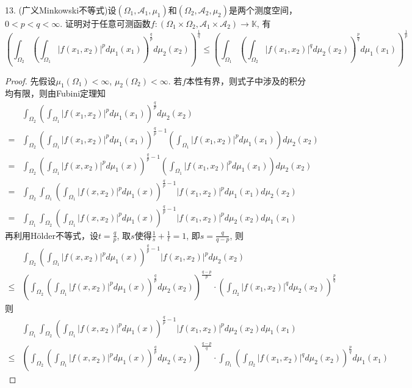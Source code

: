 \documentclass[a4paper,8pt]{ctexart}\textwidth 140mm \textheight 216mm
\newcommand{\A}{{\mathcal A}}
\newcommand{\8}{\infty}
\begin{document}
13. (广义Minkowski不等式)设$(\Omega_1,\A_1,\mu_1)$和$(\Omega_2,\A_2,\mu_2)$是两个测度空间，$0<p<q<\infty$. 证明对于任意可测函数$f:(\Omega_1\times\Omega_2,\A_1\times\A_2)\to\mathbb{K}$, 有
\begin{equation*}
(\int_{\Omega_2}(\int_{\Omega_1}|f(x_1,x_2)|^pd\mu_1(x_1))^{\frac{q}{p}}d\mu_2(x_2))^{\frac{1}{q}}\leq (\int_{\Omega_1}(\int_{\Omega_2}|f(x_1,x_2)|^qd\mu_2(x_2))^{\frac{p}{q}}d\mu_1(x_1))^{\frac{1}{p}}
\end{equation*}
\begin{proof} 
	先假设$\mu_1(\Omega_1)<\infty$, $\mu_2(\Omega_2)<\infty$. 若$f$本性有界，则式子中涉及的积分均有限，则由Fubini定理知
	\begin{equation}\label{3.13}
	\begin{split}
	&\int_{\Omega_2}(\int_{\Omega_1}|f(x_1,x_2)|^pd\mu_1(x_1))^{\frac{q}{p}}d\mu_2(x_2)\\
	=&\int_{\Omega_2}(\int_{\Omega_1}|f(x_1,x_2)|^pd\mu_1(x_1))^{\frac{q}{p}-1}(\int_{\Omega_1}|f(x_1,x_2)|^pd\mu_1(x_1))d\mu_2(x_2)\\
	=&\int_{\Omega_2}(\int_{\Omega_1}|f(x,x_2)|^pd\mu_1(x))^{\frac{q}{p}-1}(\int_{\Omega_1}|f(x_1,x_2)|^pd\mu_1(x_1))d\mu_2(x_2)\\
	=&\int_{\Omega_2}\int_{\Omega_1}(\int_{\Omega_1}|f(x,x_2)|^pd\mu_1(x))^{\frac{q}{p}-1}|f(x_1,x_2)|^pd\mu_1(x_1)d\mu_2(x_2)\\
	=&\int_{\Omega_1}\int_{\Omega_2}(\int_{\Omega_1}|f(x,x_2)|^pd\mu_1(x))^{\frac{q}{p}-1}|f(x_1,x_2)|^pd\mu_2(x_2)d\mu_1(x_1)
	\end{split}
	\end{equation}
	再利用H\"older不等式，设$t=\frac{q}{p}$, 取$s$使得$\frac{1}{s}+\frac{1}{t}=1$, 即$s=\frac{q}{q-p}$, 则
	\[\begin{split}
	&\int_{\Omega_2}(\int_{\Omega_1}|f(x,x_2)|^pd\mu_1(x))^{\frac{q}{p}-1}|f(x_1,x_2)|^pd\mu_2(x_2)\\
	\leq&	(\int_{\Omega_2}(\int_{\Omega_1}|f(x,x_2)|^pd\mu_1(x))^{\frac{q}{p}}d\mu_2(x_2))^{\frac{q-p}{p}}\cdot (\int_{\Omega_2}|f(x_1,x_2)|^qd\mu_2(x_2))^{\frac{p}{q}}
	\end{split}
	\]
	则
	\[
	\begin{split}
	&\int_{\Omega_1}\int_{\Omega_2}(\int_{\Omega_1}|f(x,x_2)|^pd\mu_1(x))^{\frac{q}{p}-1}|f(x_1,x_2)|^pd\mu_2(x_2)d\mu_1(x_1)\\
	\leq&  (\int_{\Omega_2}(\int_{\Omega_1}|f(x,x_2)|^pd\mu_1(x))^{\frac{q}{p}}d\mu_2(x_2))^{\frac{q-p}{q}}\cdot \int_{\Omega_1}(\int_{\Omega_2}|f(x_1,x_2)|^qd\mu_2(x_2))^{\frac{p}{q}}d\mu_1(x_1)

\end{split}\]
\end{proof}
\end{document}
